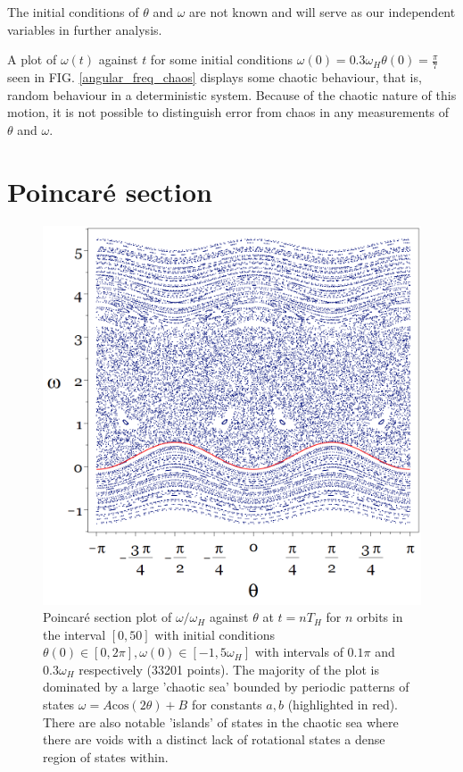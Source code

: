 \documentclass[10pt, twocolumn]{article} %
\begin{document}
The initial conditions of $\theta$ and $\omega$ are not known and will serve as our independent variables in further analysis.

A plot of $\omega(t)$ against $t$ for some initial conditions $\omega(0) = 0.3\omega_H \theta(0) = \frac{\pi}{7}$ seen in FIG. \ref{angular_freq_chaos} displays some chaotic behaviour, that is, random behaviour in a deterministic system. Because of the chaotic nature of this motion, it is not possible to distinguish error from chaos in any measurements of $\theta$ and $\omega$.

\section*{Poincar\'e section}

\begin{figure}[tb!]
  \centering
  \includegraphics[width=0.95\columnwidth]{poincare_section.png}
  \caption{Poincar\'e section plot of $\omega / \omega_H$ against $\theta$ at $t = nT_H$ for $n$ orbits in the interval $[0,50]$ with initial conditions $\theta(0) \in [0, 2 \pi], \omega(0) \in [-1, 5 \omega_H]$ with intervals of $0.1 \pi$ and $0.3 \omega_H$ respectively (33201 points). The majority of the plot is dominated by a large 'chaotic sea' bounded by periodic patterns of states $\omega = A \mathrm{cos}(2\theta)+B$ for constants $a,b$ (highlighted in red). There are also notable 'islands' of states in the chaotic sea where there are voids with a distinct lack of rotational states a dense region of states within.}
\label{poincare_section}
\end{figure}
\end{document}
